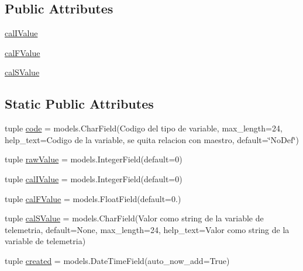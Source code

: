 \subsection*{Public Attributes}
\begin{DoxyCompactItemize}
\item 
\hyperlink{class_ground_segment_1_1models_1_1_tmly_var_1_1_tmly_var_a11e7f1de5e00c2422fc42474312d8e23}{cal\+I\+Value}
\item 
\hyperlink{class_ground_segment_1_1models_1_1_tmly_var_1_1_tmly_var_aea75651bdf109b3105ef8b477f0985cc}{cal\+F\+Value}
\item 
\hyperlink{class_ground_segment_1_1models_1_1_tmly_var_1_1_tmly_var_ae310487e7ceeb1bbeae164bf4aec0290}{cal\+S\+Value}
\end{DoxyCompactItemize}
\subsection*{Static Public Attributes}
\begin{DoxyCompactItemize}
\item 
tuple \hyperlink{class_ground_segment_1_1models_1_1_tmly_var_1_1_tmly_var_a25d017347ade2540b37c09596f233f0f}{code} = models.\+Char\+Field(\textquotesingle{}Codigo del tipo de variable\textquotesingle{}, max\+\_\+length=24, help\+\_\+text=\textquotesingle{}Codigo de la variable, se quita relacion con maestro\textquotesingle{}, default=\char`\"{}No\+Def\char`\"{})
\item 
tuple \hyperlink{class_ground_segment_1_1models_1_1_tmly_var_1_1_tmly_var_a1977b5e57c94d403dc4d6c624068ef59}{raw\+Value} = models.\+Integer\+Field(default=0)
\item 
tuple \hyperlink{class_ground_segment_1_1models_1_1_tmly_var_1_1_tmly_var_aee293dd968b0fa7700f66475eea0e32e}{cal\+I\+Value} = models.\+Integer\+Field(default=0)
\item 
tuple \hyperlink{class_ground_segment_1_1models_1_1_tmly_var_1_1_tmly_var_a1d579b5da80d996dad47a99a4ae4cea1}{cal\+F\+Value} = models.\+Float\+Field(default=0.)
\item 
tuple \hyperlink{class_ground_segment_1_1models_1_1_tmly_var_1_1_tmly_var_a49dc6e8d2412bdc61c595b4bdc3c2cbc}{cal\+S\+Value} = models.\+Char\+Field(\textquotesingle{}Valor como string de la variable de telemetria\textquotesingle{}, default=None, max\+\_\+length=24, help\+\_\+text=\textquotesingle{}Valor como string de la variable de telemetria\textquotesingle{})
\item 
tuple \hyperlink{class_ground_segment_1_1models_1_1_tmly_var_1_1_tmly_var_acc0d1d6a558e6194dfd4fbd375df6f67}{created} = models.\+Date\+Time\+Field(auto\+\_\+now\+\_\+add=True)
\end{DoxyCompactItemize}


